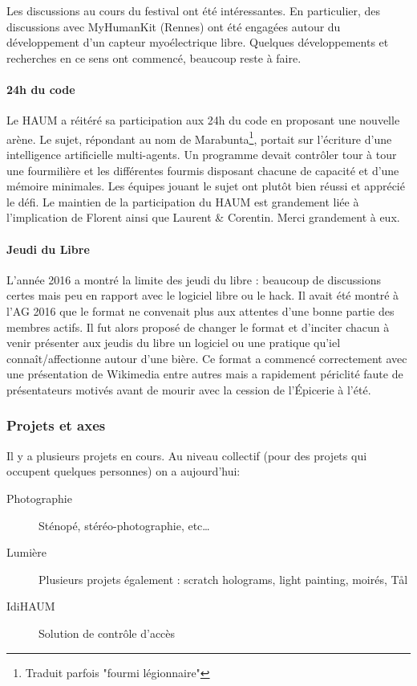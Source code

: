 \documentclass[11pt]{article}
\begin{document}
Les discussions au cours du festival ont été intéressantes. En particulier, des
discussions avec MyHumanKit (Rennes) ont été engagées autour du développement d'un capteur
myoélectrique libre. Quelques développements et recherches en ce sens ont commencé,
beaucoup reste à faire.

\paragraph{24h du code} Le HAUM a réitéré sa participation aux 24h du code en proposant
une nouvelle arène. Le sujet, répondant au nom de Marabunta\footnote{Traduit parfois
"fourmi légionnaire"}, portait sur l'écriture d'une intelligence artificielle
multi-agents. Un programme devait contrôler tour à tour une fourmilière et les différentes
fourmis disposant chacune de capacité et d'une mémoire minimales. Les équipes jouant le
sujet ont plutôt bien réussi et apprécié le défi. Le maintien de la participation du HAUM
est grandement liée à l'implication de Florent ainsi que Laurent \& Corentin. Merci
grandement à eux.

\paragraph{Jeudi du Libre} L'année 2016 a montré la limite des jeudi du libre : beaucoup
de discussions certes mais peu en rapport avec le logiciel libre ou le hack. Il avait été
montré à l'AG 2016 que le format ne convenait plus aux attentes d'une bonne partie des
membres actifs. Il fut alors proposé de changer le format et d'inciter chacun à venir
présenter aux jeudis du libre un logiciel ou une pratique qu'iel connaît/affectionne
autour d'une bière. Ce format a commencé correctement avec une présentation de Wikimedia
entre autres mais a rapidement périclité faute de présentateurs motivés avant de mourir
avec la cession de l'Épicerie à l'été.

\subsubsection{Projets et axes}

Il y a plusieurs projets en cours. Au niveau collectif (pour des projets qui occupent
quelques personnes) on a aujourd'hui:

\begin{description}
	\item[Photographie] Sténopé, stéréo-photographie, etc\ldots
	\item[Lumière] Plusieurs projets également : scratch holograms, light painting,  moirés, Tål
	\item[IdiHAUM\footnotemark] Solution de contrôle d'accès
\end{description}
\end{document}
